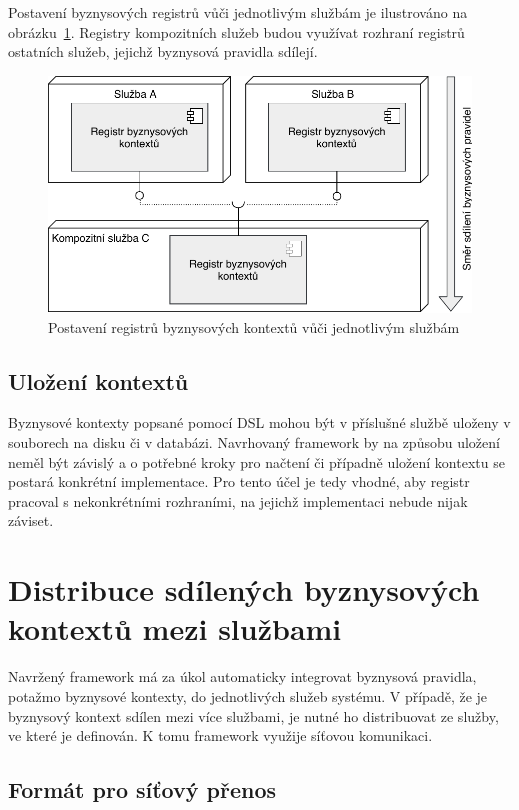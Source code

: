 Postavení byznysových registrů vůči jednotlivým službám je ilustrováno na obrázku~\ref{fig:layers-vs-framework}.
Registry kompozitních služeb budou využívat rozhraní registrů ostatních služeb, jejichž byznysová
pravidla sdílejí.

\begin{figure}
    \centering
    \includegraphics[keepaspectratio=true, width=0.7\linewidth]{figures/layers-vs-framework.pdf}
    \caption{Postavení registrů byznysových kontextů vůči jednotlivým službám}
    \label{fig:layers-vs-framework}
\end{figure}

\subsection{Uložení kontextů}

Byznysové kontexty popsané pomocí \gls{DSL} mohou být v příslušné službě uloženy v souborech na disku či v
databázi. Navrhovaný framework by na způsobu uložení neměl být závislý a o potřebné kroky
pro načtení či případně uložení kontextu se postará konkrétní implementace. Pro tento účel
je tedy vhodné, aby registr pracoval s nekonkrétními rozhraními, na jejichž implementaci
nebude nijak záviset.

\section{Distribuce sdílených byznysových kontextů mezi službami}

Navržený framework má za úkol automaticky integrovat byznysová pravidla, potažmo byznysové kontexty,
do jednotlivých služeb systému. V případě, že je byznysový kontext sdílen mezi více službami, je
nutné ho distribuovat ze služby, ve které je definován. K tomu framework využije síťovou komunikaci.

\subsection{Formát pro síťový přenos}

